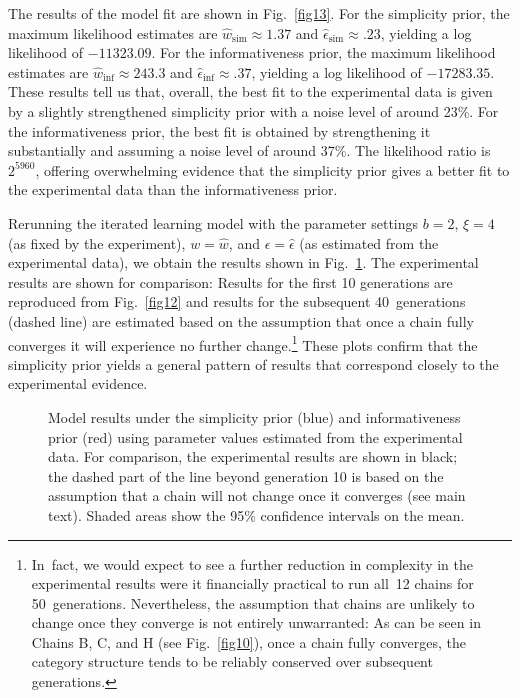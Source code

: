 \documentclass[doc,biblatex]{apa7}
\begin{document}
The results of the model fit are shown in Fig.~\ref{fig13}. For the simplicity prior, the maximum likelihood estimates are $\hat{w}_\mathrm{sim} \approx 1.37$ and $\hat{\epsilon}_\mathrm{sim} \approx .23$, yielding a log likelihood of $-11323.09$. For the informativeness prior, the maximum likelihood estimates are $\hat{w}_\mathrm{inf} \approx 243.3$ and $\hat{\epsilon}_\mathrm{inf} \approx .37$, yielding a log likelihood of $-17283.35$. These results tell us that, overall, the best fit to the experimental data is given by a slightly strengthened simplicity prior with a noise level of around 23\%. For the informativeness prior, the best fit is obtained by strengthening it substantially and assuming a noise level of around 37\%. The likelihood ratio is $2^{5960}$, offering overwhelming evidence that the simplicity prior gives a better fit to the experimental data than the informativeness prior.

Rerunning the iterated learning model with the parameter settings $b=2$, $\xi=4$ (as fixed by the experiment), $w=\hat{w}$, and $\epsilon=\hat{\epsilon}$ (as estimated from the experimental data), we obtain the results shown in Fig.~\ref{fig14}. The experimental results are shown for comparison: Results for the first 10 generations are reproduced from Fig.~\ref{fig12} and results for the subsequent 40~generations (dashed line) are estimated based on the assumption that once a chain fully converges it will experience no further change.\footnote{In~fact, we would expect to see a further reduction in complexity in the experimental results were it financially practical to run all~12 chains for 50~generations. Nevertheless, the assumption that chains are unlikely to change once they converge is not entirely unwarranted: As can be seen in Chains B, C, and H (see Fig.~\ref{fig10}), once a chain fully converges, the category structure tends to be reliably conserved over subsequent generations.} These plots confirm that the simplicity prior yields a general pattern of results that correspond closely to the experimental evidence.

	\begin{figure}
	\vspace*{2pt}
	\caption{Model results under the simplicity prior (blue) and informativeness prior (red) using parameter values estimated from the experimental data. For comparison, the experimental results are shown in black; the dashed part of the line beyond generation 10 is based on the assumption that a chain will not change once it converges (see main text). Shaded areas show the 95\% confidence intervals on the mean.}
	\label{fig14}
	\end{figure}
\end{document}
